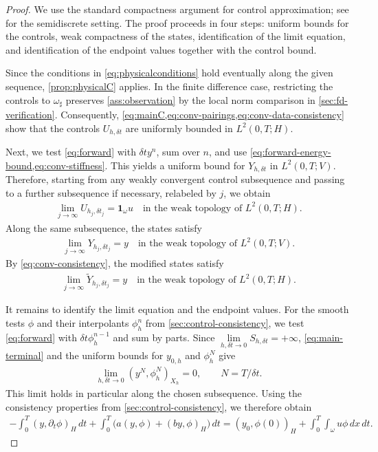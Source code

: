 \documentclass[print,wide,eng]{draft}
\begin{document}
\begin{proof}
We use the standard compactness argument for control approximation; see \cite[Theorem~2.5]{Boyer2013} for the semidiscrete setting. The proof proceeds in four steps: uniform bounds for the controls, weak compactness of the states, identification of the limit equation, and identification of the endpoint values together with the control bound.

\smallskip


Since the conditions in \cref{eq:physicalconditions} hold eventually along the given sequence, \cref{prop:physicalC} applies. In the finite difference case, restricting the controls to $\omega_\sharp$ preserves \cref{ass:observation} by the local norm comparison in \cref{sec:fd-verification}. Consequently, \cref{eq:mainC,eq:conv-pairings,eq:conv-data-consistency} show that the controls $U_{h,\delta t}$ are uniformly bounded in $L^2(0,T;H)$.

\smallskip


Next, we test \cref{eq:forward} with $\delta t y^n$, sum over $n$, and use \cref{eq:forward-energy-bound,eq:conv-stiffness}. This yields a uniform bound for $Y_{h,\delta t}$ in $L^2(0,T;V)$. Therefore, starting from any weakly convergent control subsequence and passing to a further subsequence if necessary, relabeled by $j$, we obtain
\begin{align*}
\lim_{j\to\infty}U_{h_j,\delta t_j}=\mathbf1_\omega u
\quad\text{in the weak topology of }L^2(0,T;H).
\end{align*}
Along the same subsequence, the states satisfy
\begin{align*}
\lim_{j\to\infty}Y_{h_j,\delta t_j}=y
\quad\text{in the weak topology of }L^2(0,T;V).
\end{align*}
By \cref{eq:conv-consistency}, the modified states satisfy
\begin{align*}
\lim_{j\to\infty}\widetilde Y_{h_j,\delta t_j}=y
\quad\text{in the weak topology of }L^2(0,T;H).
\end{align*}

\smallskip


It remains to identify the limit equation and the endpoint values. For the smooth tests $\phi$ and their interpolants $\phi_h^n$ from \cref{sec:control-consistency}, we test \cref{eq:forward} with $\delta t\phi_h^{n-1}$ and sum by parts. Since $\lim\limits_{h,\delta t\to0}S_{h,\delta t}=+\infty$, \cref{eq:main-terminal} and the uniform bounds for $y_{0,h}$ and $\phi_h^N$ give
\begin{align*}
\lim_{h,\delta t\to0}(y^N,\phi_h^N)_{X_h}=0,
\qquad N=T/\delta t.
\end{align*}
This limit holds in particular along the chosen subsequence.
Using the consistency properties from \cref{sec:control-consistency}, we therefore obtain
\begin{align}\label{eq:conv-limit-identity}
-\int_0^T(y,\partial_t\phi)_H\,dt
+\int_0^T\bigl(a(y,\phi)+(by,\phi)_H\bigr)\,dt
=(y_0,\phi(0))_H+\int_0^T\int_\omega u\phi\,dx\,dt.
\end{align}


\end{proof}
\end{document}
